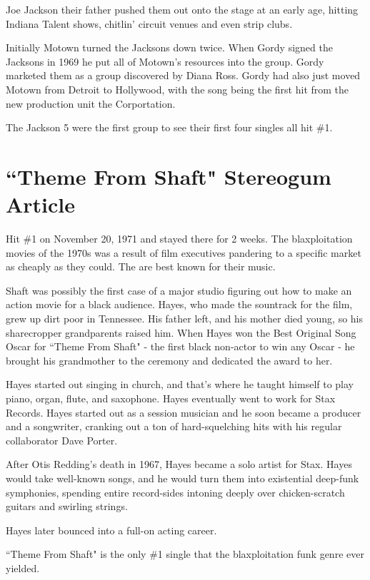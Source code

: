 \documentclass[12pt, a4paper, twoside, openright, titlepage]{book}
\begin{document}
Joe Jackson their father pushed them out onto the stage at an early age, hitting Indiana Talent shows, chitlin' circuit venues and even strip clubs. 

Initially Motown turned the Jacksons down twice. When Gordy signed the Jacksons in 1969 he put all of Motown's resources into the group. Gordy marketed them as a group discovered by Diana Ross. Gordy had also just moved Motown from Detroit to Hollywood, with the song being the first hit from the new production unit the Corportation.

The Jackson 5 were the first group to see their first four singles all hit \#1.


\section{``Theme From Shaft" Stereogum Article}

Hit \#1 on November 20, 1971 and stayed there for 2 weeks. The blaxploitation movies of the 1970s was a result of film executives pandering to a specific market as cheaply as they could. The are best known for their music. 

Shaft was possibly the first case of a major studio figuring out how to make an action movie for a black audience. Hayes, who made the sountrack for the film, grew up dirt poor in Tennessee. His father left, and his mother died young, so his sharecropper grandparents raised him. When Hayes won the Best Original Song Oscar for ``Theme From Shaft" - the first black non-actor to win any Oscar - he brought his grandmother to the ceremony and dedicated the award to her. 

Hayes started out singing in church, and that's where he taught himself to play piano, organ, flute, and saxophone. Hayes eventually went to work for Stax Records. Hayes started out as a session musician and he soon became a producer and a songwriter, cranking out a ton of hard-squelching hits with his regular collaborator Dave Porter.

After Otis Redding's death in 1967, Hayes became a solo artist for Stax. Hayes would take well-known songs, and he would turn them into existential deep-funk symphonies, spending entire record-sides intoning deeply over chicken-scratch guitars and swirling strings.

Hayes later bounced into a full-on acting career.

``Theme From Shaft" is the only \#1 single that the blaxploitation funk genre ever yielded.
\end{document}
